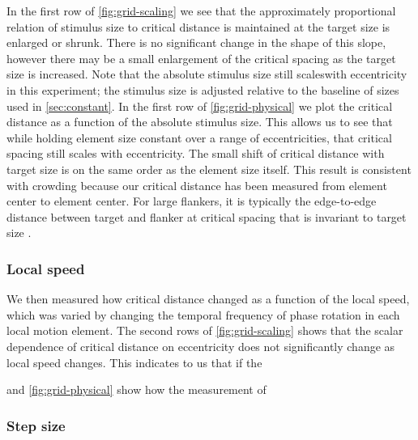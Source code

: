\documentclass[../manuscript]{subfiles}
\begin{document}
In the first row of \autoref{fig:grid-scaling} we see that the approximately proportional relation of stimulus size to critical distance is maintained at the target size is enlarged or shrunk. There is no significant change in the shape of this slope, however there may be a small enlargement of the critical spacing as the target size is increased. Note that the absolute stimulus size still scaleswith eccentricity in this experiment; the stimulus size is adjusted relative to the baseline of sizes used in \autoref{sec:constant}. In the first row of \autoref{fig:grid-physical} we plot the critical distance as a function of the absolute stimulus size. This allows us to see that while holding element size constant over a range of eccentricities, that critical spacing still scales with eccentricity.  The small shift of critical distance with target size is on the same order as the element size itself. This result is consistent with crowding because our critical distance has been measured from element center to element center. For large flankers, it is typically the edge-to-edge distance between target and flanker at critical spacing that is invariant to target size \citep{Levi:2002cs}. 

\subsubsection{Local speed}
\label{sec:grid-temporal-frequency}

We then measured how critical distance changed as a function of the local speed, which was varied by changing the temporal frequency of phase rotation in each local motion element. The second rows of \autoref{fig:grid-scaling} shows that the scalar dependence of critical distance on eccentricity does not significantly change as local speed changes. This indicates to us that if the 

and \autoref{fig:grid-physical} show how the measurement of 

\subsubsection{Step size}
\label{sec:step-size}
\end{document}
